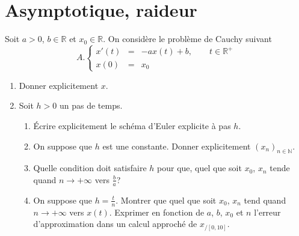 \documentclass[a4paper]{article}
\begin{document}
\section{Asymptotique, raideur}
Soit $a > 0$, $b \in \mathbb{R}$ et $x_0 \in \mathbb{R}$. On considère le problème de Cauchy suivant
\[A.\left\{\begin{array}{ccl}
x'(t)&=&-a x(t)+b, \qquad t\in \mathbb{R}^+\\
x(0)&=&x_0
\end{array}\right.
\]
\begin{enumerate}
\item  Donner explicitement $x$.
\item  Soit $h > 0$ un pas de temps.
\begin{enumerate}
       \item  Écrire explicitement le schéma d'Euler explicite à pas  $h$. 
\item  On suppose que $h$ est une constante. Donner explicitement $(x_n)_{n\in \mathbb{N}}$.
\item   Quelle condition doit satisfaire $h$ pour que, quel que soit $x_0$, $x_n$ tende quand $n \to +\infty$ vers $\frac ba$?
\item  On suppose que $h=\frac{t}{n}$. Montrer que quel que soit $x_0$, $x_n$ tend quand $n \to +\infty$ vers $x(t)$.
 Exprimer en fonction de $a$, $b$, $x_0$ et $n$ l'erreur d'approximation dans un calcul approché de $x_{/[0,10]}$.
\end{enumerate}


\end{enumerate}




%
\end{document}
